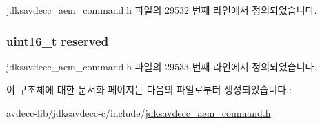 jdksavdecc\+\_\+aem\+\_\+command.\+h 파일의 29532 번째 라인에서 정의되었습니다.

\subsubsection[{\texorpdfstring{reserved}{reserved}}]{\setlength{\rightskip}{0pt plus 5cm}uint16\+\_\+t reserved}\hypertarget{structjdksavdecc__aem__command__get__video__map_a5a6ed8c04a3db86066924b1a1bf4dad3}{}\label{structjdksavdecc__aem__command__get__video__map_a5a6ed8c04a3db86066924b1a1bf4dad3}


jdksavdecc\+\_\+aem\+\_\+command.\+h 파일의 29533 번째 라인에서 정의되었습니다.



이 구조체에 대한 문서화 페이지는 다음의 파일로부터 생성되었습니다.\+:\begin{DoxyCompactItemize}
\item 
avdecc-\/lib/jdksavdecc-\/c/include/\hyperlink{jdksavdecc__aem__command_8h}{jdksavdecc\+\_\+aem\+\_\+command.\+h}\end{DoxyCompactItemize}
